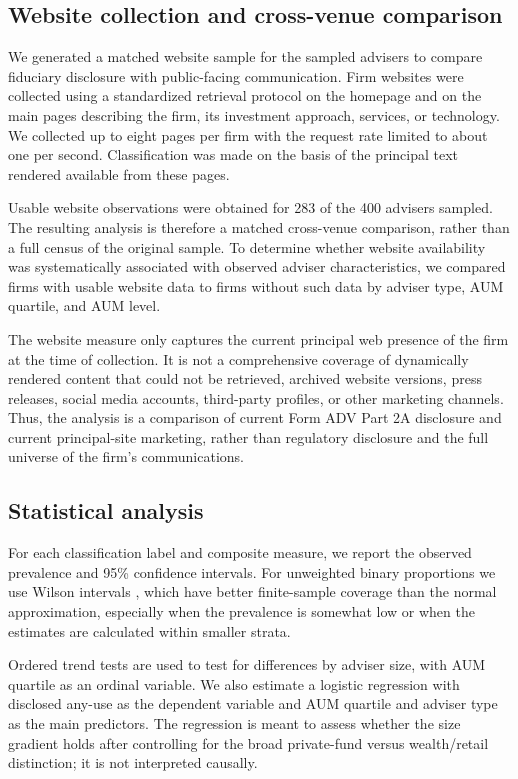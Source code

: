 \documentclass[utf8]{FrontiersinHarvard}
\begin{document}
\subsection{Website collection and cross-venue comparison}

We generated a matched website sample for the sampled advisers to compare fiduciary disclosure with public-facing communication. Firm websites were collected using a standardized retrieval protocol on the homepage and on the main pages describing the firm, its investment approach, services, or technology. We collected up to eight pages per firm with the request rate limited to about one per second. Classification was made on the basis of the principal text rendered available from these pages.

Usable website observations were obtained for 283 of the 400 advisers sampled. The resulting analysis is therefore a matched cross-venue comparison, rather than a full census of the original sample. To determine whether website availability was systematically associated with observed adviser characteristics, we compared firms with usable website data to firms without such data by adviser type, AUM quartile, and AUM level.

The website measure only captures the current principal web presence of the firm at the time of collection. It is not a comprehensive coverage of dynamically rendered content that could not be retrieved, archived website versions, press releases, social media accounts, third-party profiles, or other marketing channels. Thus, the analysis is a comparison of current Form ADV Part 2A disclosure and current principal-site marketing, rather than regulatory disclosure and the full universe of the firm's communications.

\subsection{Statistical analysis}

For each classification label and composite measure, we report the observed prevalence and 95\% confidence intervals. For unweighted binary proportions we use Wilson intervals \citep{wilson1927}, which have better finite-sample coverage than the normal approximation, especially when the prevalence is somewhat low or when the estimates are calculated within smaller strata.

Ordered trend tests are used to test for differences by adviser size, with AUM quartile as an ordinal variable. We also estimate a logistic regression with disclosed any-use as the dependent variable and AUM quartile and adviser type as the main predictors. The regression is meant to assess whether the size gradient holds after controlling for the broad private-fund versus wealth/retail distinction; it is not interpreted causally.
\end{document}
